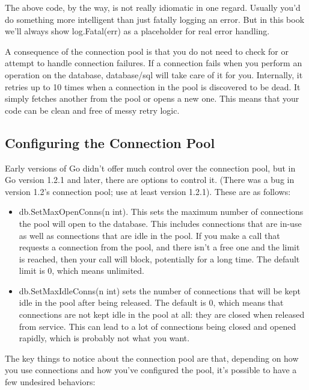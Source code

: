 \documentclass{vivid_layout}
\begin{document}
The above code, by the way, is not really idiomatic in one regard. Usually you’d do something more intelligent than just fatally logging an error. But in this book we’ll always show log.Fatal(err) as a placeholder for real error handling.

A consequence of the connection pool is that you do not need to check for or attempt to handle connection failures. If a connection fails when you perform an operation on the database, database/sql will take care of it for you. Internally, it retries up to 10 times when a connection in the pool is discovered to be dead. It simply fetches another from the pool or opens a new one. This means that your code can be clean and free of messy retry logic.

\subsection{Configuring the Connection Pool}

Early versions of Go didn’t offer much control over the connection pool, but in Go version 1.2.1 and later, there are options to control it. (There was a bug in version 1.2’s connection pool; use at least version 1.2.1). These are as follows:

\begin{itemize}

	\item db.SetMaxOpenConns(n int). This sets the maximum number of connections the pool will open to the database. This includes connections that are in-use as well as connections that are idle in the pool. If you make a call that requests a connection from the pool, and there isn’t a free one and the limit is reached, then your call will block, potentially for a long time. The default limit is 0, which means unlimited.

	\item db.SetMaxIdleConns(n int) sets the number of connections that will be kept idle in the pool after being released. The default is 0, which means that connections are not kept idle in the pool at all: they are closed when released from service. This can lead to a lot of connections being closed and opened rapidly, which is probably not what you want.

\end{itemize}

The key things to notice about the connection pool are that, depending on how you use connections and how you’ve configured the pool, it’s possible to have a few undesired behaviors:
\end{document}
